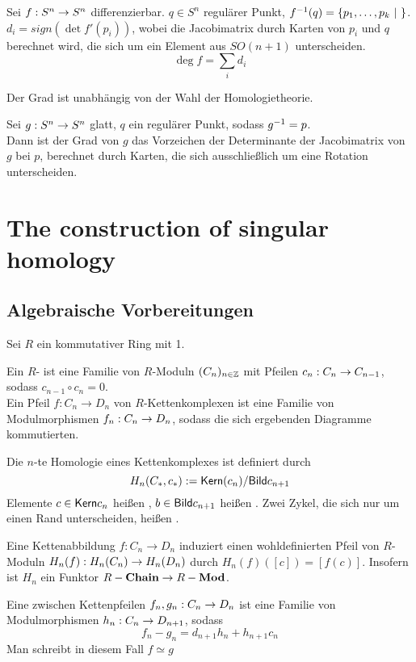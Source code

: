 \Satz{}
Sei $f : S^n \overset{}{\rightarrow} S^n$ differenzierbar. $q \in S^n$ regulärer Punkt, $f^{-1}(q) = \left\lbrace p_1,\ldots, p_k~|~ \right\rbrace$. $d_i = sign(\det f'(p_i))$, wobei die Jacobimatrix durch Karten von $p_i$ und $q$ berechnet wird, die sich um ein Element aus $SO(n+1)$ unterscheiden.
\[\deg f = \sum_i d_i \]

\Kor{}
Der Grad ist unabhängig von der Wahl der Homologietheorie.

\Lem{}
Sei $g : S^n \overset{}{\rightarrow} S^n$ glatt, $q$ ein regulärer Punkt, sodass $g^{-1} = p$.\\
Dann ist der Grad von $g$ das Vorzeichen der Determinante der Jacobimatrix von $g$ bei $p$, berechnet durch Karten, die sich ausschließlich um eine Rotation unterscheiden.

\chapter{The construction of singular homology}

\section{Algebraische Vorbereitungen}
Sei $R$ ein kommutativer Ring mit 1.

Ein $R$- ist eine Familie von $R$-Moduln $(C_n)_{n\in \mathbb{Z}}$ mit Pfeilen $c_n : C_n \overset{}{\rightarrow} C_{n-1}$, sodass $c_{n-1}\circ c_n = 0$.\\
Ein Pfeil $f : C_n \rightarrow D_n$ von $R$-{Kettenkomplexen} ist eine Familie von Modulmorphismen $f_n : C_n \overset{}{\rightarrow} D_n$, sodass die sich ergebenden Diagramme kommutierten.

Die $n$-te Homologie eines Kettenkomplexes ist definiert durch
\[ H_n(C_*,c_*) := \textsf{Kern}(c_n)/ \textsf{Bild} c_{n+1} \]
Elemente $c \in \textsf{Kern} c_n$ heißen , $b \in \textsf{Bild} c_{n+1}$ heißen . Zwei Zykel, die sich nur um einen Rand unterscheiden, heißen .

\Bem{}
Eine Kettenabbildung $f : C_n \rightarrow D_n$ induziert einen wohldefinierten Pfeil von $R$-Moduln $H_n(f) : H_n(C_n) \overset{}{\rightarrow} H_n(D_n) $ durch $H_n(f)([c]) = [f(c)]$. Insofern ist $H_n$ ein Funktor $R-\textbf{Chain} \overset{}{\rightarrow} R-\textbf{Mod}$.

Eine  zwischen Kettenpfeilen $f_n, g_n : C_n \overset{}{\rightarrow} D_n$ ist eine Familie von Modulmorphismen $h_n : C_n \overset{}{\rightarrow} D_{n+1}$, sodass
\[ f_n - g_n = d_{n+1}h_n + h_{n+1}c_n \]
Man schreibt in diesem Fall $f\simeq g$

